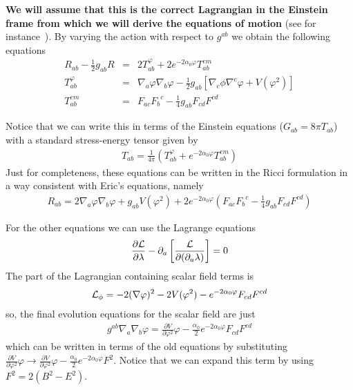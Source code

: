 \documentclass[letter,prd,aps,floatfix,superscriptaddress]{revtex4}
\begin{document}
{\bf We will assume that this is the correct Lagrangian in the Einstein frame from which we will derive the equations of motion} (see for instance~\cite{1993stqg.conf...55H,2008PhRvD..77d4034G}). By varying the action with respect to $g^{ab}$ we obtain the following equations
\begin{eqnarray}
  R_{ab} - \frac{1}{2} g_{ab} R &=& 2 T^{\varphi}_{ab} 
        + 2 e^{-2 \alpha_0 \varphi} T^{em}_{ab} \\
  T^{\varphi}_{ab}  &=& \nabla_a \varphi \nabla_b \varphi 
  - \frac{1}{2} g_{ab} \left[ \nabla_c \phi \nabla^c \varphi + V(\varphi^2) \right] \\
    T^{em}_{ab}  &=& F_{ac} {F_b}^c - \frac{1}{4} g_{ab} F_{cd} F^{cd} 
\end{eqnarray}

Notice that we can write this in terms of the Einstein equations
($G_{ab}=8 \pi T_{ab}$) with a standard stress-energy tensor given by
\begin{eqnarray}
  T_{ab} = \frac{1}{4 \pi} \left( T^{\varphi}_{ab}  
        + e^{-2 \alpha_0 \varphi} T^{em}_{ab} \right)
\end{eqnarray}
Just for completeness, these equations can be written in the Ricci formulation in a way consistent with Eric's equations, namely 
\begin{eqnarray}
  R_{ab} =  2 \nabla_a \varphi \nabla_b \varphi + g_{ab} V(\varphi^2)  
   + 2 e^{-2 \alpha_0 \varphi} 
   \left( F_{ac} {F_b}^c - \frac{1}{4} g_{ab} F_{cd} F^{cd} \right)
\end{eqnarray}


For the other equations we can use the Lagrange equations
\begin{eqnarray}
  \frac{\partial {\cal L}}{\partial \lambda} 
  -\partial_a \left[ \frac{{\cal L}}{\partial (\partial_a \lambda)} \right] = 0
\end{eqnarray}
The part of the Lagrangian containing scalar field terms is
\begin{eqnarray}
  {\cal L}_{\phi} = - 2 (\nabla \varphi)^2 - 2 V(\varphi^2) - e^{-2 \alpha_0 \varphi} F_{cd} F^{cd}
\end{eqnarray}
so, the final evolution equations for the scalar field are just
\begin{eqnarray}
  g^{ab} \nabla_a \nabla_b \varphi =  \frac{\partial V}{\partial \varphi^2} \varphi - \frac{\alpha_0}{2} e^{-2 \alpha_0 \varphi} F_{cd} F^{cd}
\end{eqnarray}
which can be written in terms of the old equations by substituting
$\frac{\partial V}{\partial \varphi^2} \varphi \rightarrow  \frac{\partial V}{\partial \varphi^2} \varphi - \frac{\alpha_0}{2} e^{-2 \alpha_0 \varphi} F^2$. Notice that we can expand this term by using
$F^2 = 2 (B^2 - E^2)$.
\end{document}
